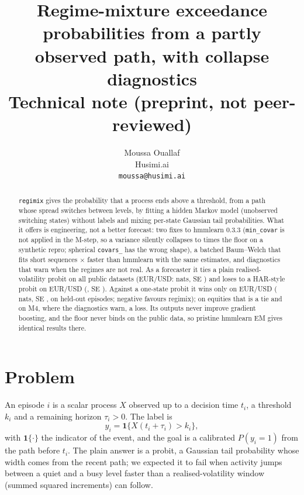 \documentclass{article}
\title{Regime-mixture exceedance probabilities from a partly observed path, with collapse diagnostics\\[6pt]{\normalsize\normalfont Technical note (preprint, not peer-reviewed)}}
\author{%
  Moussa Ouallaf \\
  Husimi.ai \\
  \texttt{moussa@husimi.ai} \\
}
\begin{document}
\maketitle

\begin{abstract}
\texttt{regimix} gives the probability that a process ends above a threshold, from a path whose spread switches between levels, by fitting a hidden Markov model (unobserved switching states) without labels and mixing per-state Gaussian tail probabilities.
What it offers is engineering, not a better forecast: two fixes to hmmlearn 0.3.3 (\texttt{min\_covar} is not applied in the M-step, so a variance silently collapses to \nReproFloorFrac{} times the floor on a synthetic repro; spherical \texttt{covars\_} has the wrong shape), a batched Baum--Welch that fits \nSpeedNC{} short sequences \nSpeedC$\times$ faster than hmmlearn with the same estimates, and diagnostics that warn when the regimes are not real.
As a forecaster it ties a plain realised-volatility probit on all \nCfgNData{} public datasets (EUR/USD: \nFxRvD{} nats, SE \nFxRvSE) and loses to a HAR-style probit on EUR/USD (\nFxHarD, SE \nFxHarSE).
Against a one-state probit it wins only on EUR/USD (\nFxKoneD{} nats, SE \nFxKoneSE, on \nFxNTest{} held-out episodes; negative favours regimix); on equities that is a tie and on M4, where the diagnostics warn, a loss.
Its outputs never improve gradient boosting, and the floor never binds on the public data, so pristine hmmlearn EM gives identical results there.
\end{abstract}

\section{Problem}
\label{sec:problem}

An episode $i$ is a scalar process $X$ observed up to a decision time $t_i$, a threshold $k_i$ and a remaining horizon $\tau_i>0$.
The label is
\begin{equation}
  y_i = \mathbf{1}\{X(t_i+\tau_i) > k_i\},
  \label{eq:label}
\end{equation}
with $\mathbf{1}\{\cdot\}$ the indicator of the event, and the goal is a calibrated $P(y_i=1)$ from the path before $t_i$.
The plain answer is a probit, a Gaussian tail probability whose width comes from the recent path; we expected it to fail when activity jumps between a quiet and a busy level faster than a realised-volatility window (summed squared increments) can follow.
\end{document}
